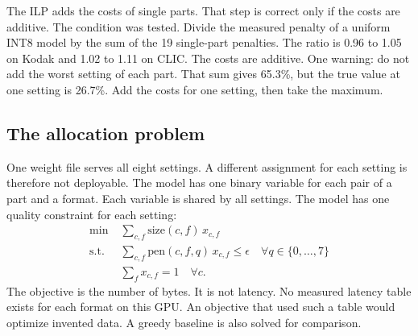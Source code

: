 \documentclass[10pt,twocolumn]{article}
\begin{document}
The ILP adds the costs of single parts. That step is correct only if the costs are additive. The condition was tested. Divide the measured penalty of a uniform INT8 model by the sum of the 19 single-part
penalties. The ratio is 0.96 to 1.05 on Kodak and 1.02 to 1.11 on CLIC. The costs are additive.
One warning: do not add the worst setting of each part. That sum gives 65.3\%, but the true value at one
setting is 26.7\%. Add the costs for one setting, then take the maximum.

\subsection{The allocation problem}
One weight file serves all eight settings. A different assignment for each setting is therefore not
deployable. The model has one binary variable for each pair of a part and a format. Each variable is
shared by all settings. The model has one quality constraint for each setting:
\begin{equation*}
\begin{aligned}
\min\;&\textstyle\sum_{c,f}\text{size}(c,f)\,x_{c,f}\\
\text{s.t.}\;&\textstyle\sum_{c,f}\text{pen}(c,f,q)\,x_{c,f}\le \epsilon \quad \forall q\in\{0,\dots,7\}\\
&\textstyle\sum_{f} x_{c,f}=1 \quad \forall c .
\end{aligned}
\end{equation*}
The objective is the number of bytes. It is not latency. No measured latency table exists for each
format on this GPU. An objective that used such a table would optimize invented data.
A greedy baseline is also solved for comparison.
\end{document}
